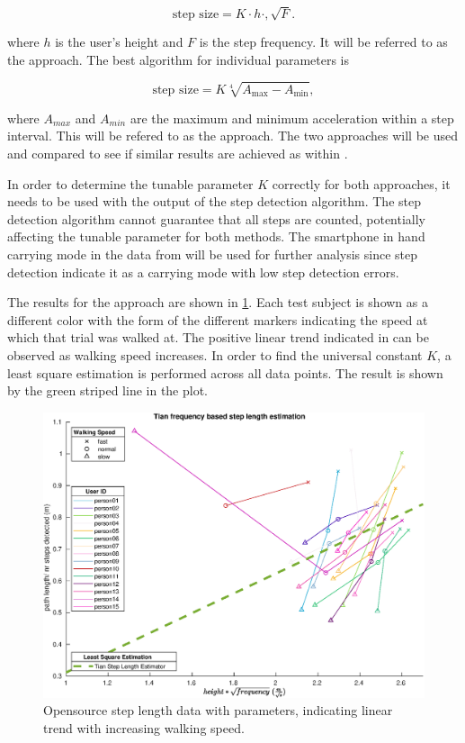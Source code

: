 \begin{equation}
	\label{eq:Tian2016_sle2}
	\text{step size} = K \cdot h \cdot, \sqrt{F}.
\end{equation}


 where $h$ is the user's height and $F$ is the step frequency. It will be referred to as the \citet{Tian2016} approach. The best algorithm for individual parameters is 
 
 \begin{equation}
 	\text{step size} =K \sqrt[4]{A_{\max }-A_{\min }},
 	\label{eq:weinberg_stepsize2}
 \end{equation}
 
 where $A_{max}$ and $A_{min}$ are the maximum and minimum acceleration within a step interval. This will be refered to as the \citet{Weinberg2002} approach. The two approaches will be used and compared to see if similar results are achieved as within \cite{Vezocnik2019}.

In order to determine the tunable parameter $K$ correctly for both approaches, it needs to be used with the output of the step detection algorithm. The step detection algorithm cannot guarantee that all steps are counted, potentially affecting the tunable parameter for both methods. 
The smartphone in hand carrying mode in the data from \cite{Vezocnik2019} will be used for further analysis since step detection indicate it as a carrying mode with low step detection errors. \par

The results for the \citet{Tian2016} approach are shown in \cref{fig:step_length_tian}. Each test subject is shown as a different color with the form of the different markers indicating the speed at which that trial was walked at. The positive linear trend indicated in \cite{Tian2016} can be observed as walking speed increases. In order to find the universal constant $K$, a least square estimation is performed across all data points. The result is shown by the green striped line in the plot. 

	\begin{figure}[H]
	\centering
	\includegraphics[width=0.8\linewidth]{images/20201113_1634_tian}
	\caption{Opensource step length data with \citet{Tian2016} parameters, indicating linear trend with increasing walking speed.}
	\label{fig:step_length_tian}
	\end{figure}
	
